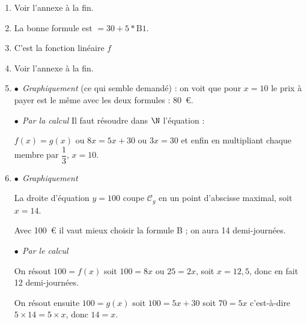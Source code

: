 \begin{enumerate}
\item %
Voir l'annexe à la fin.
\item La bonne formule est $=30+5*\text{B}1$.


\item %


C'est la fonction linéaire $f$
\item %
Voir l'annexe à la fin.
\item %
$\bullet~~$\emph{Graphiquement} (ce qui semble demandé) : on voit que pour $x = 10$ le prix à payer est le même avec les deux formules : 80~\euro.

$\bullet~~$\emph{Par la calcul} Il faut résoudre dans $\N$ l'équation : 

$f(x) = g(x)$ ou $8x = 5x + 30$ ou $3x = 30$ et enfin en multipliant chaque membre par $\dfrac{1}{3}$, \: $x = 10$.
\item %

$\bullet~~$\emph{Graphiquement} 

La droite d'équation $y = 100$ coupe $\mathcal{C}_g$ en un point d'abscisse maximal, soit $x = 14$.

Avec 100~\euro{} il vaut mieux choisir la formule B ; on aura 14 demi-journées.

$\bullet~~$\emph{Par le calcul}

On résout $100 = f(x)$ soit $100 = 8x$ ou $25 = 2x$, soit $x = 12,5$, donc en fait 12 demi-journées.

On résout ensuite $100 = g(x)$ soit $100 = 5x + 30$ soit $70 = 5x$ c'est-à-dire $5 \times 14 = 5 \times x$, donc $14 = x$.
\end{enumerate}


